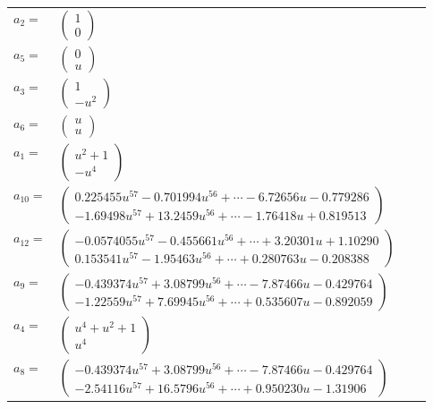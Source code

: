 \documentclass[1p]{elsarticle_modified}
\theoremstyle{definition}
\begin{document}
\begin{tabular}{m{7pt} m{180pt} m{7pt} m{180pt} }
\flushright $a_{2}=$&$\begin{pmatrix}1\\0\end{pmatrix}$ \\
\flushright $a_{5}=$&$\begin{pmatrix}0\\u\end{pmatrix}$ \\
\flushright $a_{3}=$&$\begin{pmatrix}1\\- u^2\end{pmatrix}$ \\
\flushright $a_{6}=$&$\begin{pmatrix}u\\u\end{pmatrix}$ \\
\flushright $a_{1}=$&$\begin{pmatrix}u^2+1\\- u^4\end{pmatrix}$ \\
\flushright $a_{10}=$&$\begin{pmatrix}0.225455 u^{57}-0.701994 u^{56}+\cdots-6.72656 u-0.779286\\-1.69498 u^{57}+13.2459 u^{56}+\cdots-1.76418 u+0.819513\end{pmatrix}$ \\
\flushright $a_{12}=$&$\begin{pmatrix}-0.0574055 u^{57}-0.455661 u^{56}+\cdots+3.20301 u+1.10290\\0.153541 u^{57}-1.95463 u^{56}+\cdots+0.280763 u-0.208388\end{pmatrix}$ \\
\flushright $a_{9}=$&$\begin{pmatrix}-0.439374 u^{57}+3.08799 u^{56}+\cdots-7.87466 u-0.429764\\-1.22559 u^{57}+7.69945 u^{56}+\cdots+0.535607 u-0.892059\end{pmatrix}$ \\
\flushright $a_{4}=$&$\begin{pmatrix}u^4+u^2+1\\u^4\end{pmatrix}$ \\
\flushright $a_{8}=$&$\begin{pmatrix}-0.439374 u^{57}+3.08799 u^{56}+\cdots-7.87466 u-0.429764\\-2.54116 u^{57}+16.5796 u^{56}+\cdots+0.950230 u-1.31906\end{pmatrix}$ \\

\end{tabular}
\end{document}
